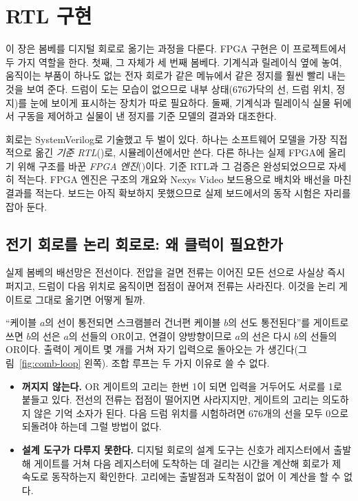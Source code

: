 \chapter{RTL 구현}\label{ch:rtl}

이 장은 봄베를 디지털 회로로 옮기는 과정을 다룬다. FPGA 구현은 이 프로젝트에서 두 가지 역할을 한다.
첫째, 그 자체가 세 번째 봄베다. 기계식과 릴레이식 옆에 놓여, 움직이는 부품이 하나도 없는 전자 회로가
같은 메뉴에서 같은 정지를 훨씬 빨리 내는 것을 보여 준다. 드럼이 도는 모습이 없으므로 내부 상태(676가닥의
선, 드럼 위치, 정지)를 눈에 보이게 표시하는 장치가 따로 필요하다. 둘째, 기계식과 릴레이식 실물 뒤에서
구동을 제어하고 실물이 낸 정지를 기준 모델의 결과와 대조한다.

회로는 SystemVerilog로 기술했고 두 벌이 있다.
하나는 소프트웨어 모델을 가장 직접적으로 옮긴 \emph{기준 RTL}()로, 시뮬레이션에서만 쓴다.
다른 하나는 실제 FPGA에 올리기 위해 구조를 바꾼 \emph{FPGA 엔진}()이다. 기준 RTL과 그 검증은
완성되었으므로 자세히 적는다. FPGA 엔진은 구조의 개요와 Nexys Video 보드용으로 배치와 배선을 마친 결과를
적는다. 보드는 아직 확보하지 못했으므로 실제 보드에서의 동작 시험은 자리를 잡아 둔다.

\section{전기 회로를 논리 회로로: 왜 클럭이 필요한가}\label{sec:why-clock}

실제 봄베의 배선망은 전선이다. 전압을 걸면 전류는 이어진 모든 선으로 사실상 즉시 퍼지고, 드럼이 다음
위치로 움직이면 접점이 끊어져 전류는 사라진다. 이것을 논리 게이트로 그대로 옮기면 어떻게 될까.

``케이블 $a$의 선이 통전되면 스크램블러 건너편 케이블 $b$의 선도 통전된다''를 게이트로 쓰면 $b$의 선은
$a$의 선들의 OR이고, 연결이 양방향이므로 $a$의 선은 다시 $b$의 선들의 OR이다. 출력이 게이트 몇 개를 거쳐
자기 입력으로 돌아오는 가 생긴다(그림~\ref{fig:comb-loop} 왼쪽).
조합 루프는 두 가지 이유로 쓸 수 없다.

\begin{itemize}
\item \textbf{꺼지지 않는다.} OR 게이트의 고리는 한번 1이 되면 입력을 거두어도 서로를 1로 붙들고 있다.
전선의 전류는 접점이 떨어지면 사라지지만, 게이트의 고리는 의도하지 않은 기억 소자가 된다. 다음 드럼
위치를 시험하려면 676개의 선을 모두 0으로 되돌려야 하는데 그럴 방법이 없다.
\item \textbf{설계 도구가 다루지 못한다.} 디지털 회로의 설계 도구는 신호가 레지스터에서 출발해 게이트를
거쳐 다음 레지스터에 도착하는 데 걸리는 시간을 계산해 회로가 제 속도로 동작하는지 확인한다. 고리에는
출발점과 도착점이 없어 이 계산을 할 수 없다.
\end{itemize}

